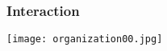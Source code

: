 \begin{frame}[allowframebreaks]
\frametitle{Interaction}
\texttt{[image: organization00.jpg]}
\end{frame}
